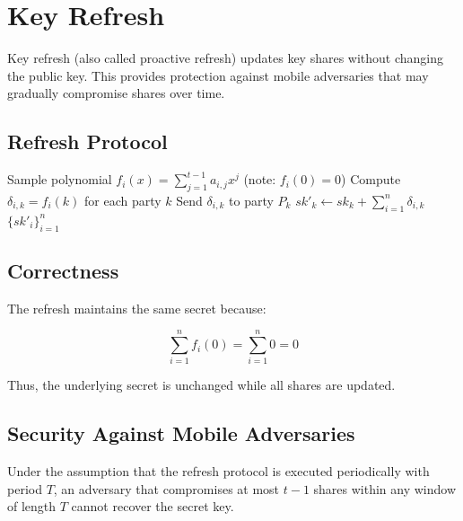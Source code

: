\documentclass[11pt,twocolumn]{article}
\begin{document}
\section{Key Refresh}

Key refresh (also called proactive refresh) updates key shares without changing the public key. This provides protection against mobile adversaries that may gradually compromise shares over time.

\subsection{Refresh Protocol}

\begin{algorithm}
\caption{Key Refresh}
\label{alg:key-refresh}
\begin{algorithmic}[1]
        \State Sample polynomial $f_i(x) = \sum_{j=1}^{t-1} a_{i,j} x^j$ (note: $f_i(0) = 0$)
        \State Compute $\delta_{i,k} = f_i(k)$ for each party $k$
        \State Send $\delta_{i,k}$ to party $P_k$
    \EndFor
        \State $sk'_k \gets sk_k + \sum_{i=1}^n \delta_{i,k}$
    \EndFor
    \State \Return $\{sk'_i\}_{i=1}^n$
\EndProcedure
\end{algorithmic}
\end{algorithm}

\subsection{Correctness}

The refresh maintains the same secret because:

\begin{equation}
\sum_{i=1}^n f_i(0) = \sum_{i=1}^n 0 = 0
\end{equation}

Thus, the underlying secret is unchanged while all shares are updated.

\subsection{Security Against Mobile Adversaries}

\begin{theorem}
Under the assumption that the refresh protocol is executed periodically with period $T$, an adversary that compromises at most $t-1$ shares within any window of length $T$ cannot recover the secret key.
\end{theorem}
\end{document}
